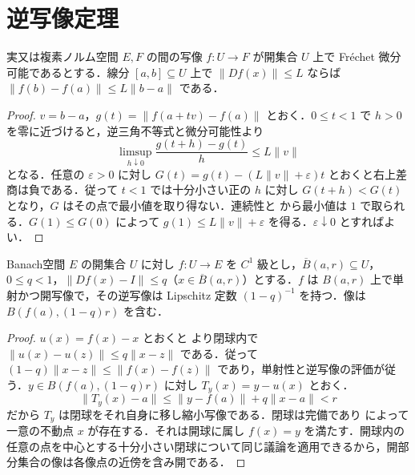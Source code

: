 \section{逆写像定理}
\begin{prop}[ノルム空間値写像の平均値評価]
実又は複素ノルム空間 $E,F$ の間の写像 $f:U\to F$ が開集合 $U$ 上で Fréchet 微分可能であるとする．線分 $[a,b]\subseteq U$ 上で $\|Df(x)\|\leq L$ ならば $\|f(b)-f(a)\|\leq L\|b-a\|$ である．
\end{prop}
\begin{proof}
$v=b-a$，$g(t)=\|f(a+tv)-f(a)\|$ とおく．$0\leq t<1$ で $h>0$ を零に近づけると，逆三角不等式と微分可能性より
\[
\limsup_{h\downarrow0}\frac{g(t+h)-g(t)}h\leq L\|v\|
\]
となる．任意の $\varepsilon>0$ に対し $G(t)=g(t)-(L\|v\|+\varepsilon)t$ とおくと右上差商は負である．従って $t<1$ では十分小さい正の $h$ に対し $G(t+h)<G(t)$ となり，$G$ はその点で最小値を取り得ない．連続性と  から最小値は $1$ で取られる．$G(1)\leq G(0)$ によって $g(1)\leq L\|v\|+\varepsilon$ を得る．$\varepsilon\downarrow0$ とすればよい．
\end{proof}
\begin{prop}[恒等写像に近い写像の局所可逆性]
Banach空間 $E$ の開集合 $U$ に対し $f:U\to E$ を $C^1$ 級とし，$\overline B(a,r)\subseteq U$，$0\leq q<1$，$\|Df(x)-I\|\leq q$（$x\in\overline B(a,r)$）とする．$f$ は $B(a,r)$ 上で単射かつ開写像で，その逆写像は Lipschitz 定数 $(1-q)^{-1}$ を持つ．像は $B(f(a),(1-q)r)$ を含む．
\end{prop}
\begin{proof}
$u(x)=f(x)-x$ とおくと  より閉球内で $\|u(x)-u(z)\|\leq q\|x-z\|$ である．従って $(1-q)\|x-z\|\leq\|f(x)-f(z)\|$ であり，単射性と逆写像の評価が従う．$y\in B(f(a),(1-q)r)$ に対し $T_y(x)=y-u(x)$ とおく．
\[
\|T_y(x)-a\|\leq\|y-f(a)\|+q\|x-a\|<r
\]
だから $T_y$ は閉球をそれ自身に移し縮小写像である．閉球は完備であり  によって一意の不動点 $x$ が存在する．それは開球に属し $f(x)=y$ を満たす．開球内の任意の点を中心とする十分小さい閉球について同じ議論を適用できるから，開部分集合の像は各像点の近傍を含み開である．
\end{proof}
